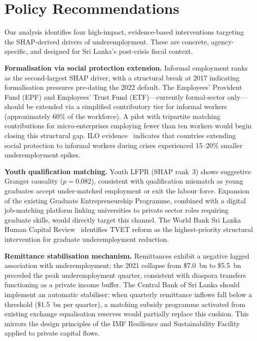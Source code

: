 \documentclass[sigconf]{acmart}
\begin{document}
\section{Policy Recommendations}

Our analysis identifies four high-impact, evidence-based interventions
targeting the SHAP-derived drivers of underemployment.
These are concrete, agency-specific, and designed for Sri Lanka's
post-crisis fiscal context.

\textbf{Formalisation via social protection extension.}
Informal employment ranks as the second-largest SHAP driver, with a
structural break at 2017 indicating formalisation pressures pre-dating
the 2022 default. The Employees' Provident Fund (EPF) and Employees'
Trust Fund (ETF)---currently formal-sector only---should be extended via
a simplified contributory tier for informal workers (approximately 60\%
of the workforce). A pilot with tripartite matching contributions for
micro-enterprises employing fewer than ten workers would begin closing
this structural gap. ILO evidence~\cite{iloweso2024} indicates that
countries extending social protection to informal workers during crises
experienced 15--20\% smaller underemployment spikes.

\textbf{Youth qualification matching.}
Youth LFPR (SHAP rank~3) shows suggestive Granger causality ($p{=}0.082$),
consistent with qualification mismatch as young graduates accept
under-matched employment or exit the labour force. Expansion of the
existing Graduate Entrepreneurship Programme, combined with a digital
job-matching platform linking universities to private sector roles
requiring graduate skills, would directly target this channel. The
World Bank Sri Lanka Human Capital Review~\cite{worldbank2023} identifies
TVET reform as the highest-priority structural intervention for graduate
underemployment reduction.

\textbf{Remittance stabilisation mechanism.}
Remittances exhibit a negative lagged association with underemployment;
the 2021 collapse from \$7.0~bn to \$5.5~bn preceded the peak
underemployment quarter, consistent with diaspora transfers functioning
as a private income buffer. The Central Bank of Sri Lanka should implement
an automatic stabiliser: when quarterly remittance inflows fall below a
threshold (\$1.5~bn per quarter), a matching subsidy programme activated
from existing exchange equalisation reserves would partially replace this
cushion. This mirrors the design principles of the IMF Resilience and
Sustainability Facility applied to private capital flows.
\end{document}
